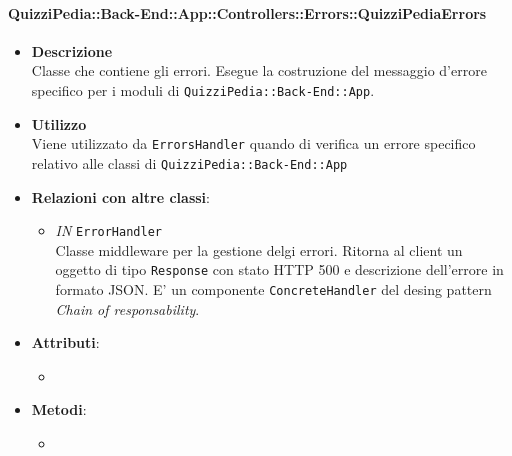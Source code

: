 \paragraph{QuizziPedia::Back-End::App::Controllers::Errors::QuizziPediaErrors}
	\begin{itemize}
		\item \textbf{Descrizione} \\
		Classe che contiene gli errori. Esegue la costruzione del messaggio d'errore specifico per i moduli di \texttt{QuizziPedia::Back-End::App}.
		\item \textbf{Utilizzo} \\
		Viene utilizzato da \texttt{ErrorsHandler} quando di verifica un errore specifico relativo alle classi di \texttt{QuizziPedia::Back-End::App}
		\item \textbf{Relazioni con altre classi}:
			 \begin{itemize}
			 	\item \textit{IN} \texttt{ErrorHandler} \\
			 	Classe middleware per la gestione delgi errori. Ritorna al client un oggetto di tipo \texttt{Response} con stato HTTP 500 e descrizione dell'errore in formato JSON. E' un componente \texttt{ConcreteHandler} del desing pattern \textit{Chain of responsability}.
			 \end{itemize}
		\item \textbf{Attributi}:
			 \begin{itemize}
			 	\item 
			 \end{itemize}
		\item \textbf{Metodi}:
			\begin{itemize}
				\item 
			\end{itemize}
	\end{itemize}